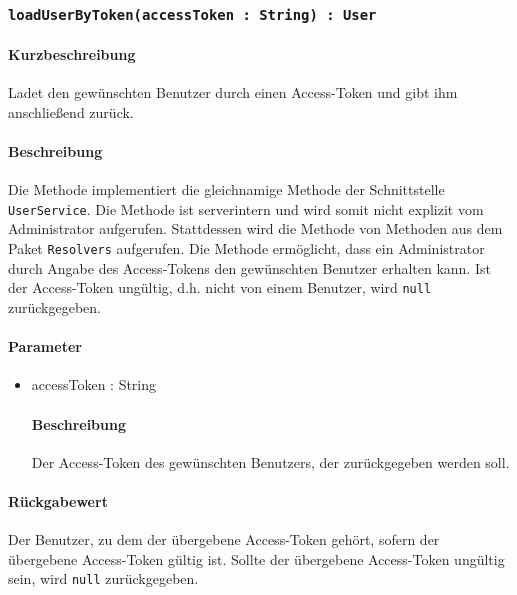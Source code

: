 \subsubsection{\texttt{loadUserByToken(accessToken : String) : User}}%
\paragraph*{Kurzbeschreibung}
Ladet den gewünschten Benutzer durch einen Access-Token und gibt ihm anschließend zurück.
\paragraph*{Beschreibung}
Die Methode implementiert die gleichnamige Methode der Schnittstelle \texttt{UserService}.
Die Methode ist serverintern und wird somit nicht explizit vom Administrator aufgerufen.
Stattdessen wird die Methode von Methoden aus dem Paket \texttt{Resolvers} aufgerufen.
Die Methode ermöglicht, dass ein Administrator durch Angabe des Access-Tokens den gewünschten Benutzer erhalten kann. 
Ist der Access-Token ungültig, d.h. nicht von einem Benutzer, wird \texttt{null} zurückgegeben.
\paragraph*{Parameter}
\begin{itemize}
    \item accessToken : String
    		\paragraph*{Beschreibung}
    		Der Access-Token des gewünschten Benutzers, der zurückgegeben werden soll.
\end{itemize}
\paragraph*{Rückgabewert}
Der Benutzer, zu dem der übergebene Access-Token gehört, sofern der übergebene Access-Token gültig ist.
Sollte der übergebene Access-Token ungültig sein, wird \texttt{null} zurückgegeben.

